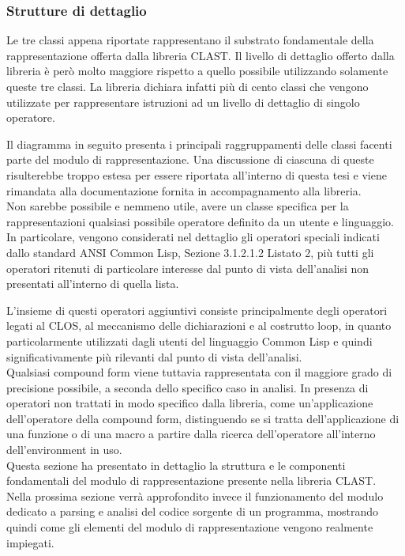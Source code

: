 \subsubsection{Strutture di dettaglio}

Le tre classi appena riportate rappresentano il substrato fondamentale della
rappresentazione offerta dalla libreria CLAST. Il livello di dettaglio offerto
dalla libreria è però molto maggiore rispetto a quello possibile utilizzando
solamente queste tre classi. La libreria dichiara infatti più di cento classi
che vengono utilizzate per rappresentare istruzioni ad un livello di dettaglio
di singolo operatore.

Il diagramma in seguito presenta i principali raggruppamenti delle classi
facenti parte del modulo di rappresentazione. Una discussione di ciascuna di
queste risulterebbe troppo estesa per essere riportata all’interno di questa
tesi e viene rimandata alla documentazione fornita in accompagnamento alla
libreria.\\

Non sarebbe possibile e nemmeno utile, avere un classe specifica per la
rappresentazioni qualsiasi possibile operatore definito da un utente e
linguaggio. In particolare, vengono considerati nel dettaglio gli operatori
speciali indicati dallo standard ANSI Common Lisp, Sezione 3.1.2.1.2 Listato
2, più tutti gli operatori ritenuti di particolare interesse dal punto di
vista dell’analisi non presentati all’interno di quella lista.

L'insieme di questi operatori aggiuntivi consiste principalmente degli
operatori legati al CLOS, al meccanismo delle dichiarazioni e al costrutto
loop, in quanto particolarmente utilizzati dagli utenti del linguaggio Common
Lisp e quindi significativamente più rilevanti dal punto di vista
dell’analisi.\\

Qualsiasi compound form viene tuttavia rappresentata con il maggiore grado di
precisione possibile, a seconda dello specifico caso in analisi. In presenza
di operatori non trattati in modo specifico dalla libreria, come
un'applicazione dell'operatore della compound form, distinguendo se si tratta
dell’applicazione di una funzione o di una macro a partire dalla ricerca
dell'operatore all'interno dell'environment in uso.\\

Questa sezione ha presentato in dettaglio la struttura e le componenti
fondamentali del modulo di rappresentazione presente nella libreria CLAST.
Nella prossima sezione verrà approfondito invece il funzionamento del modulo
dedicato a parsing e analisi del codice sorgente di un programma, mostrando
quindi come gli elementi del modulo di rappresentazione vengono realmente
impiegati.
